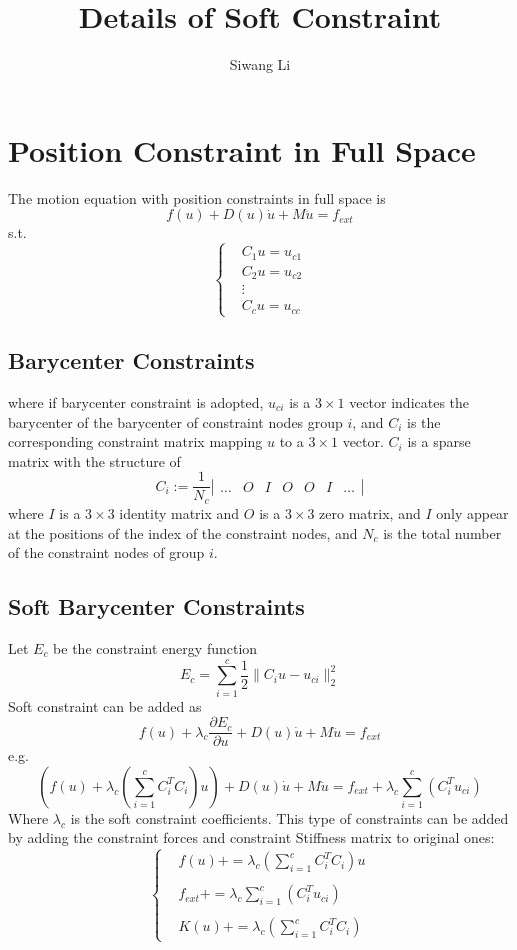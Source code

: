 \documentclass[twocolumn]{article}
\author{Siwang Li}
\title{Details of Soft Constraint}
\begin{document}
\maketitle

\section{Position Constraint in Full Space}
The motion equation with position constraints in full space is
\begin{equation}
f(u) + D(u)\dot{u} + M \ddot{u} = f_{ext}
\end{equation}
s.t.
$$
\left\{ \begin{array}{rl}
&C_1 u = u_{c1}\\
&C_2 u = u_{c2}\\
&\vdots \\
&C_c u = u_{cc}
\end{array} \right.
$$
\subsection{Barycenter Constraints}
where if barycenter constraint is adopted,
$u_{ci}$ is a $3\times1$ vector indicates the barycenter
of the barycenter of constraint nodes group $i$,
and $C_i$ is the corresponding constraint matrix mapping $u$ to
a $3\times1$ vector. $C_i$ is a sparse matrix with the structure of
$$
C_i := \frac{1}{N_c}
\left| \begin{array}{ccccccc}
  \ldots & O & I & O & O & I &\ldots
  \end{array}\right|
$$
where $I$ is a $3\times3$ identity matrix and $O$ is a $3\times3$ 
zero matrix, and $I$ only appear at the positions of the index of the 
constraint nodes, and $N_c$ is the total number of the constraint nodes
of group $i$.
\subsection{Soft Barycenter Constraints}
Let $E_c$ be the constraint energy function
\begin{equation}
E_c = \sum_{i=1}^{c} \frac{1}{2} \|C_i u - u_{ci}\|_2^2
\end{equation}
Soft constraint can be added as
\begin{equation}
f(u)+ {\lambda}_c {\frac{\partial{E_c}} {\partial{u}}} + D(u)\dot{u} + M \ddot{u} = f_{ext}
\end{equation}
e.g.
\begin{equation}
(f(u)+ {\lambda}_c(\sum_{i=1}^c C_i^T C_i) u) + D(u)\dot{u} + M \ddot{u} = f_{ext}+ {\lambda}_c\sum_{i=1}^c({C_i^T u_{ci}})
\end{equation}
Where $\lambda_c$ is the soft constraint coefficients.
This type of constraints can be added by adding the constraint forces and constraint Stiffness matrix to
original ones:
$$
\left\{ \begin{array}{rl}
&f(u) += \lambda_c (\sum_{i=1}^c C_i^T C_i) u \\\\
&f_{ext} += {\lambda}_c\sum_{i=1}^c({C_i^T u_{ci}})\\\\
&K(u) += \lambda_c (\sum_{i=1}^c C_i^T C_i)
\end{array} \right.
$$
\end{document}
